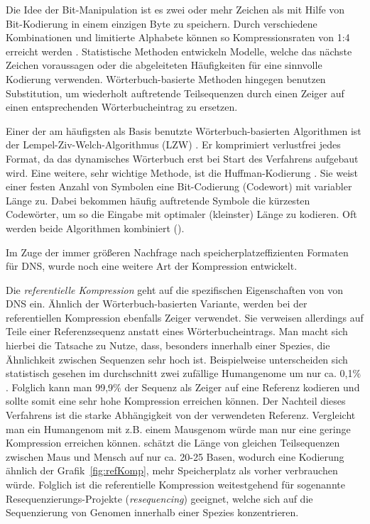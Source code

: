 \documentclass[12pt]{article}
\begin{document}
Die Idee der Bit-Manipulation ist es zwei oder mehr Zeichen als mit Hilfe von Bit-Kodierung in einem einzigen Byte zu speichern. Durch verschiedene Kombinationen und limitierte Alphabete können so Kompressionsraten von 1:4 erreicht werden \cite{rani14new}. Statistische Methoden entwickeln Modelle, welche das nächste Zeichen voraussagen oder die abgeleiteten Häufigkeiten für eine sinnvolle Kodierung verwenden. Wörterbuch-basierte Methoden hingegen benutzen Substitution, um wiederholt auftretende Teilsequenzen durch einen Zeiger auf einen entsprechenden Wörterbucheintrag zu ersetzen. 

Einer der am häufigsten als Basis benutzte Wörterbuch-basierten Algorithmen ist der Lempel-Ziv-Welch-Algorithmus (LZW) \cite{Ziv77auniversal}. Er komprimiert verlustfrei jedes Format, da das dynamisches Wörterbuch erst bei Start des Verfahrens aufgebaut wird. Eine weitere, sehr wichtige Methode, ist die Huffman-Kodierung \cite{huffman}. Sie weist einer festen Anzahl von Symbolen eine Bit-Codierung (Codewort) mit variabler Länge zu. Dabei bekommen häufig auftretende Symbole die kürzesten Codewörter, um so die Eingabe mit optimaler (kleinster) Länge zu kodieren. Oft werden beide Algorithmen kombiniert (\cite{software:gzip}).

Im Zuge der immer größeren Nachfrage nach speicherplatzeffizienten Formaten für DNS, wurde noch eine weitere Art der Kompression entwickelt.

Die \emph{referentielle Kompression} geht auf die spezifischen Eigenschaften von von DNS ein. Ähnlich der Wörterbuch-basierten Variante, werden bei der referentiellen Kompression ebenfalls Zeiger verwendet. Sie verweisen allerdings auf Teile einer Referenzsequenz anstatt eines Wörterbucheintrags. Man macht sich hierbei die Tatsache zu Nutze, dass, besonders innerhalb einer Spezies, die Ähnlichkeit zwischen Sequenzen sehr hoch ist. Beispielweise unterscheiden sich statistisch gesehen im durchschnitt zwei zufällige Humangenome um nur ca. 0,1$\%$ \cite{Venter16022001}. Folglich kann man 99,9$\%$ der Sequenz als Zeiger auf eine Referenz kodieren und sollte somit eine sehr hohe Kompression erreichen können. Der Nachteil dieses Verfahrens ist die starke Abhängigkeit von der verwendeten Referenz. Vergleicht man ein Humangenom mit z.B. einem Mausgenom würde man nur eine geringe Kompression erreichen können. \cite{wandelt14trends} schätzt die Länge von gleichen Teilsequenzen zwischen Maus und Mensch auf nur ca. 20-25 Basen, wodurch eine Kodierung ähnlich der Grafik~\ref{fig:refKomp}, mehr Speicherplatz als vorher verbrauchen würde. Folglich ist die referentielle Kompression weitestgehend für sogenannte Resequenzierungs-Projekte (\textit{resequencing}) geeignet, welche sich auf die Sequenzierung von Genomen innerhalb einer Spezies konzentrieren. \\
\end{document}
